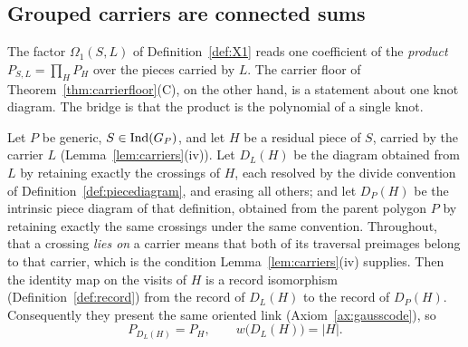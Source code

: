 \subsection{Grouped carriers are connected sums}

The factor $\Omega_1(S,L)$ of Definition~\ref{def:X1} reads one coefficient of
the \emph{product} $P_{S,L}=\prod_H P_H$ over the pieces carried by $L$. The
carrier floor of Theorem~\ref{thm:carrierfloor}(C), on the other hand, is a
statement about one knot diagram. The bridge is that the product is the
polynomial of a single knot.

\begin{lemma}
\label{lem:pieceintrinsic}
Let $P$ be generic, $S\in\operatorname{Ind}(G_P)$, and let $H$ be a residual piece of $S$,
carried by the carrier $L$ (Lemma~\ref{lem:carriers}(iv)). Let $D_L(H)$ be the
diagram obtained from $L$ by retaining exactly the crossings of $H$, each
resolved by the divide convention of Definition~\ref{def:piecediagram}, and
erasing all others; and let $D_P(H)$ be the intrinsic piece diagram of that
definition, obtained from the parent polygon $P$ by retaining exactly the same
crossings under the same convention. Throughout, that a crossing \emph{lies on}
a carrier means that both of its traversal preimages belong to that carrier,
which is the condition Lemma~\ref{lem:carriers}(iv) supplies.
Then the identity map on the visits of $H$ is a record isomorphism
(Definition~\ref{def:record}) from the record of $D_L(H)$ to the record of
$D_P(H)$. Consequently they present the same oriented link
(Axiom~\ref{ax:gausscode}), so
\[
   P_{D_L(H)}=P_H,\qquad w\bigl(D_L(H)\bigr)=|H| .
\]
\end{lemma}
